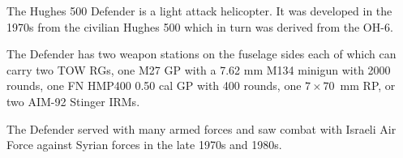 

The Hughes 500 Defender is a light attack helicopter. It was developed in the 1970s from the civilian Hughes 500 which in turn was derived from the OH-6.

The Defender has two weapon stations on the fuselage sides each of which can carry two TOW RGs, one M27 GP with a 7.62 mm M134 minigun with 2000 rounds, one FN HMP400 0.50 cal GP with 400 rounds, one $7\times 70$~mm RP, or two AIM-92 Stinger IRMs.

The Defender served with many armed forces and saw combat with Israeli Air Force against Syrian forces in the late 1970s and 1980s.